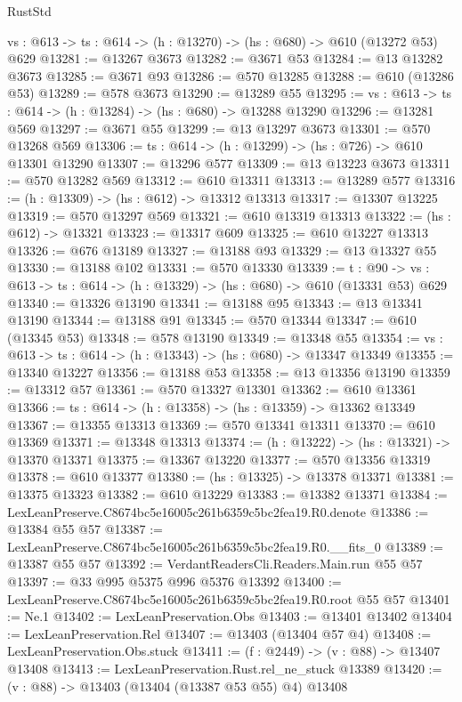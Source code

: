 \begin{lexlean}{RustStd}
\begin{coremodule}
  {vs : @613} -> {ts : @614} -> (h : @13270) -> (hs : @680) -> @610 (@13272 @53) @629
@13281 := @13267 @3673
@13282 := @3671 @53
@13284 := @13 @13282 @3673
@13285 := @3671 @93
@13286 := @570 @13285
@13288 := @610 (@13286 @53)
@13289 := @578 @3673
@13290 := @13289 @55
@13295 := {vs : @613} -> {ts : @614} -> (h : @13284) -> (hs : @680) -> @13288 @13290
@13296 := @13281 @569
@13297 := @3671 @55
@13299 := @13 @13297 @3673
@13301 := @570 @13268 @569
@13306 := {ts : @614} -> (h : @13299) -> (hs : @726) -> @610 @13301 @13290
@13307 := @13296 @577
@13309 := @13 @13223 @3673
@13311 := @570 @13282 @569
@13312 := @610 @13311
@13313 := @13289 @577
@13316 := (h : @13309) -> (hs : @612) -> @13312 @13313
@13317 := @13307 @13225
@13319 := @570 @13297 @569
@13321 := @610 @13319 @13313
@13322 := (hs : @612) -> @13321
@13323 := @13317 @609
@13325 := @610 @13227 @13313
@13326 := @676 @13189
@13327 := @13188 @93
@13329 := @13 @13327 @55
@13330 := @13188 @102
@13331 := @570 @13330
@13339 := {t : @90} ->
  {vs : @613} -> {ts : @614} -> (h : @13329) -> (hs : @680) -> @610 (@13331 @53) @629
@13340 := @13326 @13190
@13341 := @13188 @95
@13343 := @13 @13341 @13190
@13344 := @13188 @91
@13345 := @570 @13344
@13347 := @610 (@13345 @53)
@13348 := @578 @13190
@13349 := @13348 @55
@13354 := {vs : @613} -> {ts : @614} -> (h : @13343) -> (hs : @680) -> @13347 @13349
@13355 := @13340 @13227
@13356 := @13188 @53
@13358 := @13 @13356 @13190
@13359 := @13312 @57
@13361 := @570 @13327 @13301
@13362 := @610 @13361
@13366 := {ts : @614} -> (h : @13358) -> (hs : @13359) -> @13362 @13349
@13367 := @13355 @13313
@13369 := @570 @13341 @13311
@13370 := @610 @13369
@13371 := @13348 @13313
@13374 := (h : @13222) -> (hs : @13321) -> @13370 @13371
@13375 := @13367 @13220
@13377 := @570 @13356 @13319
@13378 := @610 @13377
@13380 := (hs : @13325) -> @13378 @13371
@13381 := @13375 @13323
@13382 := @610 @13229
@13383 := @13382 @13371
@13384 := LexLeanPreserve.C8674bc5e16005c261b6359c5bc2fea19.R0.denote
@13386 := @13384 @55 @57
@13387 := LexLeanPreserve.C8674bc5e16005c261b6359c5bc2fea19.R0.__fits_0
@13389 := @13387 @55 @57
@13392 := VerdantReadersCli.Readers.Main.run @55 @57
@13397 := @33 @995 @5375 @996 @5376 @13392
@13400 := LexLeanPreserve.C8674bc5e16005c261b6359c5bc2fea19.R0.root @55 @57
@13401 := Ne.{1}
@13402 := LexLeanPreservation.Obs
@13403 := @13401 @13402
@13404 := LexLeanPreservation.Rel
@13407 := @13403 (@13404 @57 @4)
@13408 := LexLeanPreservation.Obs.stuck
@13411 := (f : @2449) -> (v : @88) -> @13407 @13408
@13413 := LexLeanPreservation.Rust.rel_ne_stuck @13389
@13420 := (v : @88) -> @13403 (@13404 (@13387 @53 @55) @4) @13408

\end{coremodule}
\end{lexlean}
